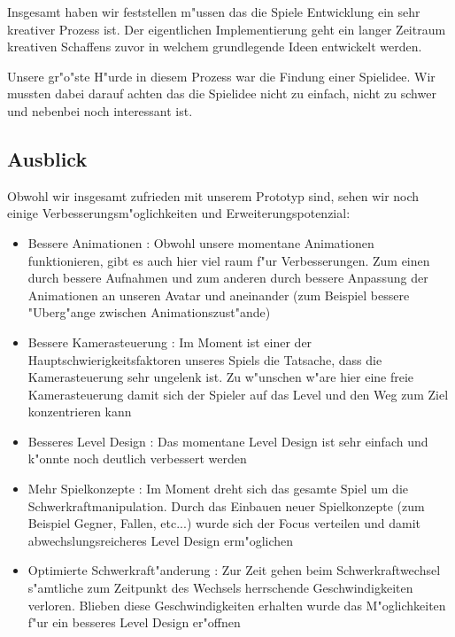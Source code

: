 Insgesamt haben wir feststellen m"ussen das die Spiele Entwicklung ein sehr kreativer Prozess ist. Der eigentlichen Implementierung geht ein langer Zeitraum kreativen Schaffens zuvor in welchem grundlegende Ideen entwickelt werden.

Unsere gr"o"ste H"urde in diesem Prozess war die Findung einer Spielidee. Wir mussten dabei darauf achten das die Spielidee nicht zu einfach, nicht zu schwer und nebenbei noch interessant ist.
%
\subsection{Ausblick}
\label{sec:results/future}
%
Obwohl wir insgesamt zufrieden mit unserem Prototyp sind, sehen wir noch einige Verbesserungsm"oglichkeiten und Erweiterungspotenzial:
\begin{itemize}
	\item Bessere Animationen : Obwohl unsere momentane Animationen funktionieren, gibt es auch hier viel raum f"ur Verbesserungen. Zum einen durch bessere Aufnahmen und zum anderen durch bessere Anpassung der Animationen an unseren Avatar und aneinander (zum Beispiel bessere "Uberg"ange zwischen Animationszust"ande)
	\item Bessere Kamerasteuerung : Im Moment ist einer der Hauptschwierigkeitsfaktoren unseres Spiels die Tatsache, dass die Kamerasteuerung sehr ungelenk ist. Zu w"unschen w"are hier eine freie Kamerasteuerung damit sich der Spieler auf das Level und den Weg zum Ziel konzentrieren kann
	\item Besseres Level Design : Das momentane Level Design ist sehr einfach und k"onnte noch deutlich verbessert werden
	\item Mehr Spielkonzepte : Im Moment dreht sich das gesamte Spiel um die Schwerkraftmanipulation. Durch das Einbauen neuer Spielkonzepte (zum Beispiel Gegner, Fallen, etc...) wurde sich der Focus verteilen und damit abwechslungsreicheres Level Design erm"oglichen
	\item Optimierte Schwerkraft"anderung : Zur Zeit gehen beim Schwerkraftwechsel s"amtliche zum Zeitpunkt des Wechsels herrschende Geschwindigkeiten verloren. Blieben diese Geschwindigkeiten erhalten wurde das M"oglichkeiten f"ur ein besseres Level Design er"offnen 
\end{itemize}
